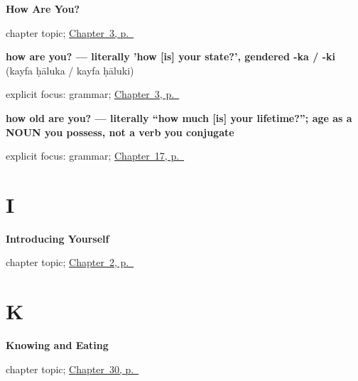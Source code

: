 \noindent\begin{minipage}[t]{\linewidth}
\raggedright
\textbf{How Are You?}\par
\footnotesize chapter topic; \hyperref[ch:ar-how-are-you]{Chapter~3, p.~\pageref*{ch:ar-how-are-you}}
\end{minipage}\par\smallskip

\noindent\begin{minipage}[t]{\linewidth}
\raggedright
\textbf{how are you? — literally 'how {[}is{]} your state?', gendered -ka / -ki}\enspace\emph{ }\enspace(kayfa ḥāluka / kayfa ḥāluki)\par
\footnotesize explicit focus: grammar; \hyperref[ch:ar-how-are-you]{Chapter~3, p.~\pageref*{ch:ar-how-are-you}}
\end{minipage}\par\smallskip

\noindent\begin{minipage}[t]{\linewidth}
\raggedright
\textbf{how old are you? — literally \textquotedblleft{}how much {[}is{]} your lifetime?\textquotedblright{}; age as a NOUN you possess, not a verb you conjugate}\enspace\emph{ }\par
\footnotesize explicit focus: grammar; \hyperref[ch:ar-asking-age]{Chapter~17, p.~\pageref*{ch:ar-asking-age}}
\end{minipage}\par\smallskip

\section*{I}

\noindent\begin{minipage}[t]{\linewidth}
\raggedright
\textbf{Introducing Yourself}\par
\footnotesize chapter topic; \hyperref[ch:introductions]{Chapter~2, p.~\pageref*{ch:introductions}}
\end{minipage}\par\smallskip

\section*{K}

\noindent\begin{minipage}[t]{\linewidth}
\raggedright
\textbf{Knowing and Eating}\par
\footnotesize chapter topic; \hyperref[ch:ar-knowing-and-eating]{Chapter~30, p.~\pageref*{ch:ar-knowing-and-eating}}
\end{minipage}\par\smallskip

